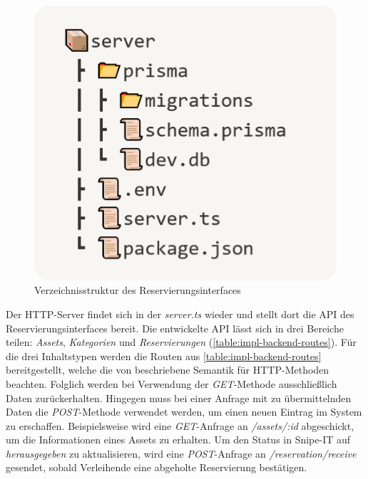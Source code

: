 \begin{figure}[h]
  \centering
  \includegraphics[scale=0.4]{Bilder/verzeichnisback.png}
  \caption{Verzeichnisstruktur des Reservierungsinterfaces}
  \label{fig:db}
\end{figure}

Der HTTP-Server findet sich in der \textit{server.ts} wieder und stellt dort die API des
Reservierungsinterfaces bereit. Die entwickelte API lässt sich in drei Bereiche teilen:
\textit{Assets}, \textit{Kategorien} und \textit{Reservierungen} (\ref{table:impl-backend-routes}).
Für die drei Inhaltstypen werden die Routen aus \ref{table:impl-backend-routes} bereitgestellt,
welche die von  beschriebene Semantik für HTTP-Methoden beachten.
Folglich werden bei Verwendung der \textit{GET}-Methode ausschließlich Daten zurückerhalten.
Hingegen muss bei einer Anfrage mit zu übermittelnden Daten die \textit{POST}-Methode verwendet
werden, um einen neuen Eintrag im System zu erschaffen. Beispielsweise wird eine
\textit{GET}-Anfrage an \textit{/assets/:id} abgeschickt, um die Informationen eines Assets zu
erhalten. Um den Status in Snipe-IT auf \textit{herausgegeben} zu aktualisieren, wird eine
\textit{POST}-Anfrage an \textit{/reservation/receive} gesendet, sobald Verleihende eine abgeholte
Reservierung bestätigen.

